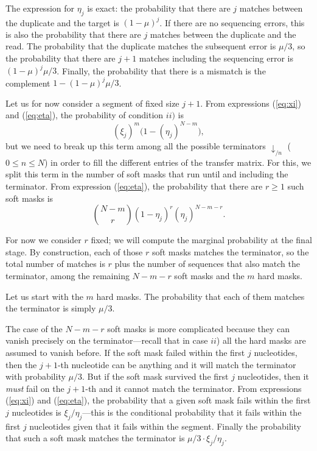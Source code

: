\documentclass{article}
\begin{document}
The expression for $\eta_j$ is exact: the probability that there are $j$
matches between the duplicate and the target is $(1-\mu)^j$. If there are
no sequencing errors, this is also the probability that there are $j$
matches between the duplicate and the read. The probability that the
duplicate matches the subsequent error is $\mu/3$, so the probability
that there are $j+1$ matches including the sequencing error is
$(1-\mu)^j\mu/3$. Finally, the probability that there is a mismatch is the
complement $1-(1-\mu)^j\mu/3$.

Let us for now consider a segment of fixed size $j+1$. From expressions
(\ref{eq:xi}) and (\ref{eq:eta}), the probability of condition $ii)$ is
\begin{equation*}
(\xi_j)^m \Big(1 - (\eta_j)^{N-m} \Big),
\end{equation*}
but we need to break up this term among all the possible terminators
$\downarrow_{/n}$ ($0 \leq n \leq N$) in order to fill the different
entries of the transfer matrix. For this, we split this term in the number
of soft masks that run until and including the terminator. From expression
(\ref{eq:eta}), the probability that there are $r \geq 1$ such soft masks
is
\begin{equation}
\label{eq:softmasks_r}
{N-m \choose r} (1 - \eta_j)^r (\eta_j)^{N-m-r}.
\end{equation}

For now we consider $r$ fixed; we will compute the marginal probability at
the final stage. By construction, each of those $r$ soft masks matches the
terminator, so the total number of matches is $r$ plus the number of
sequences that also match the terminator, among the remaining $N-m-r$ soft
masks and the $m$ hard masks.

Let us start with the $m$ hard masks. The probability that each of them
matches the terminator is simply $\mu/3$.

The case of the $N-m-r$ soft masks is more complicated because they can
vanish precisely on the terminator---recall that in case $ii$) all the
hard masks are assumed to vanish before. If the soft mask failed within
the first $j$ nucleotides, then the $j+1$-th nucleotide can be anything
and it will match the terminator with probability $\mu/3$. But if the soft
mask survived the first $j$ nucleotides, then it \emph{must} fail on the
$j+1$-th and it cannot match the terminator. From expressions
(\ref{eq:xi}) and (\ref{eq:eta}), the probability that a given soft mask
fails within the first $j$ nucleotides is $\xi_j/\eta_j$---this is the
conditional probability that it fails within the first $j$ nucleotides
given that it fails within the segment. Finally the probability that such
a soft mask matches the terminator is $\mu/3 \cdot \xi_j / \eta_j$.
\end{document}
